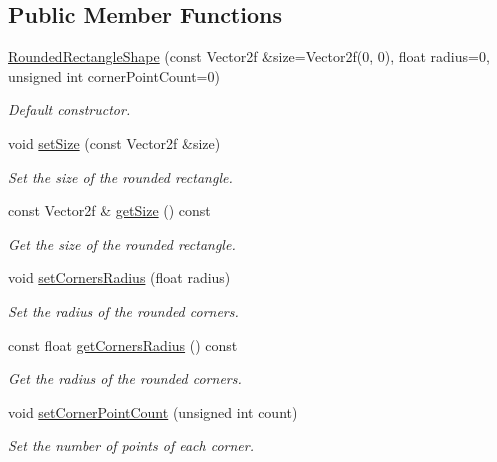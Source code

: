 \subsection*{Public Member Functions}
\begin{DoxyCompactItemize}
\item 
\mbox{\hyperlink{classsf_1_1_rounded_rectangle_shape_aa49850069d9921338a5727073ecf2475}{Rounded\+Rectangle\+Shape}} (const Vector2f \&size=Vector2f(0, 0), float radius=0, unsigned int corner\+Point\+Count=0)
\begin{DoxyCompactList}\small\item\em Default constructor. \end{DoxyCompactList}\item 
void \mbox{\hyperlink{classsf_1_1_rounded_rectangle_shape_a6c768c97f3b1412f8b310c3c64b7cc91}{set\+Size}} (const Vector2f \&size)
\begin{DoxyCompactList}\small\item\em Set the size of the rounded rectangle. \end{DoxyCompactList}\item 
const Vector2f \& \mbox{\hyperlink{classsf_1_1_rounded_rectangle_shape_a437e3e5a964b0716ae5aa55b77693993}{get\+Size}} () const
\begin{DoxyCompactList}\small\item\em Get the size of the rounded rectangle. \end{DoxyCompactList}\item 
void \mbox{\hyperlink{classsf_1_1_rounded_rectangle_shape_a0ab2eff482d3a0a2444d8fa5178c4af4}{set\+Corners\+Radius}} (float radius)
\begin{DoxyCompactList}\small\item\em Set the radius of the rounded corners. \end{DoxyCompactList}\item 
const float \mbox{\hyperlink{classsf_1_1_rounded_rectangle_shape_ab3c3d79d1206063215fa2d4e2a0d56a6}{get\+Corners\+Radius}} () const
\begin{DoxyCompactList}\small\item\em Get the radius of the rounded corners. \end{DoxyCompactList}\item 
void \mbox{\hyperlink{classsf_1_1_rounded_rectangle_shape_a2c390618b1f93fcd406018c0ed2eaa2f}{set\+Corner\+Point\+Count}} (unsigned int count)
\begin{DoxyCompactList}\small\item\em Set the number of points of each corner. \end{DoxyCompactList}\item 

\end{DoxyCompactItemize}
